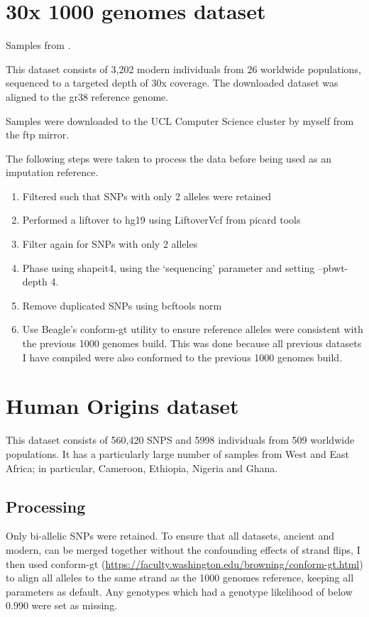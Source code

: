 \section{30x 1000 genomes dataset} \label{1000genomesdataset}

Samples from \cite{byrska2021high}.

This dataset consists of 3,202 modern individuals from 26 worldwide populations, sequenced to a targeted depth of 30x coverage. The downloaded dataset was aligned to the gr38 reference genome.

Samples were downloaded to the UCL Computer Science cluster by myself from the ftp mirror.

The following steps were taken to process the data before being used as an imputation reference. 

\begin{enumerate}
\item Filtered such that SNPs with only 2 alleles were retained
\item Performed a liftover to hg19 using LiftoverVcf from picard tools \cite{Picard2018toolkit}
\item Filter again for SNPs with only 2 alleles
\item Phase using shapeit4, using the `sequencing' parameter and setting --pbwt-depth 4.
\item Remove duplicated SNPs using bcftools norm \cite{li2009sequence} 
\item Use Beagle's conform-gt utility to ensure reference alleles were consistent with the previous 1000 genomes build. This was done because all previous datasets I have compiled were also conformed to the previous 1000 genomes build. 
\end{enumerate}

\section{Human Origins dataset}

This dataset consists of 560,420 SNPS and 5998 individuals from 509 worldwide populations. It has a particularly large number of samples from West and East Africa; in particular, Cameroon, Ethiopia, Nigeria and Ghana. 

\subsection{Processing}

Only bi-allelic SNPs were retained. To ensure that all datasets, ancient and modern, can be merged together without the confounding effects of strand flips, I then used conform-gt (\url{https://faculty.washington.edu/browning/conform-gt.html}) to align all alleles to the same strand as the 1000 genomes reference, keeping all parameters as default. Any genotypes which had a genotype likelihood of below 0.990 were set as missing.

